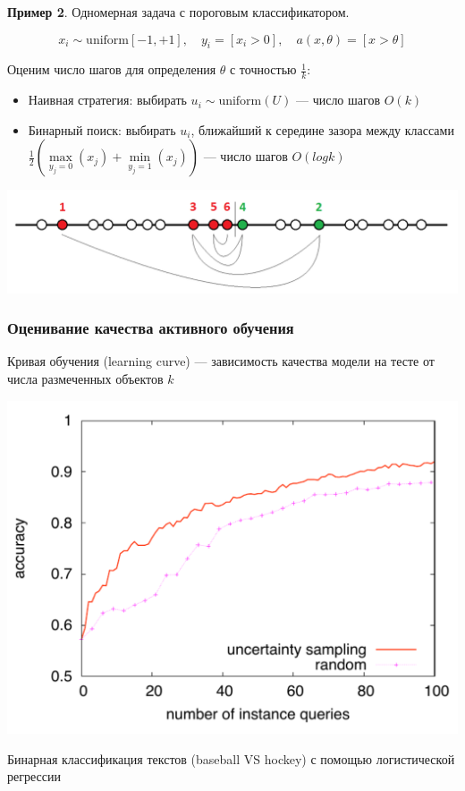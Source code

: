 \documentclass[fullscreen=true, bookmarks=true, hyperref={pdfencoding=unicode}]{beamer}
\begin{document}
\begin{frame}

  {\bf Пример 2}. Одномерная задача с пороговым классификатором.

  $$ x_i \sim \text{uniform}[-1, +1], \quad y_i = [x_i > 0], \quad a(x, \theta) = [x > \theta]$$

  Оценим число шагов для определения $\theta$ с точностью $\frac{1}{k}$:
  \begin{itemize}
    \item Наивная стратегия: выбирать $ u_i \sim \text{uniform}(U)$ — число шагов $O(k)$
    \item Бинарный поиск: выбирать $ u_i $, ближайший к середине зазора между классами $\frac{1}{2} \left( \max\limits_{y_j=0}(x_j) + \min\limits_{y_j=1}(x_j) \right)$ — число шагов $O(log k)$
  \end{itemize}

  \begin{center}
    \includegraphics[keepaspectratio,
                     width=.8\paperwidth]{bin_search.png}
  \end{center}

\end{frame}


\begin{frame}
  \frametitle{Оценивание качества активного обучения}
    Кривая обучения (learning curve) — зависимость качества модели на тесте от числа размеченных объектов $k$

  \begin{center}
    \includegraphics[keepaspectratio,
                     width=.6\paperwidth]{learning_curve.png}

    Бинарная классификация текстов (baseball VS hockey) с помощью логистической регрессии
  \end{center}

\end{frame}
\end{document}
